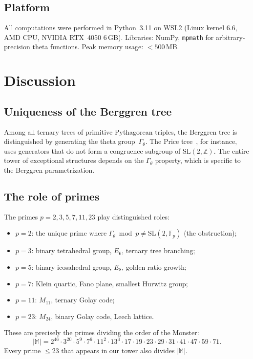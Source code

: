 \documentclass[12pt]{amsart}
\theoremstyle{definition}
\theoremstyle{remark}
\newcommand{\SL}{\mathrm{SL}}
\newcommand{\Fp}{\mathbb{F}_p}
\newcommand{\Z}{\mathbb{Z}}
\newcommand{\Gtheta}{\Gamma_\theta}
\newcommand{\Monster}{\mathbb{M}}
\begin{document}
\subsection{Platform}

All computations were performed in Python~3.11 on WSL2 (Linux kernel
6.6, AMD CPU, NVIDIA RTX~4050 6\,GB).  Libraries: NumPy,
\texttt{mpmath} for arbitrary-precision theta functions.  Peak memory
usage: $< 500$\,MB.

\section{Discussion}\label{sec:discussion}

\subsection{Uniqueness of the Berggren tree}

Among all ternary trees of primitive Pythagorean triples, the
Berggren tree is distinguished by generating the theta group~$\Gtheta$.
The Price tree~\cite{price}, for instance, uses generators that do not
form a congruence subgroup of $\SL(2,\Z)$.  The entire tower of
exceptional structures depends on the $\Gtheta$ property, which is
specific to the Berggren parametrization.

\subsection{The role of primes}

The primes $p = 2, 3, 5, 7, 11, 23$ play distinguished roles:
\begin{itemize}
\item $p = 2$: the unique prime where $\Gtheta \bmod p \ne \SL(2,\Fp)$
  (the obstruction);
\item $p = 3$: binary tetrahedral group, $E_6$, ternary tree branching;
\item $p = 5$: binary icosahedral group, $E_8$, golden ratio growth;
\item $p = 7$: Klein quartic, Fano plane, smallest Hurwitz group;
\item $p = 11$: $M_{11}$, ternary Golay code;
\item $p = 23$: $M_{24}$, binary Golay code, Leech lattice.
\end{itemize}
These are precisely the primes dividing the order of the Monster:
\[
|\Monster| = 2^{46}\cdot 3^{20}\cdot 5^9\cdot 7^6\cdot 11^2\cdot
13^3\cdot 17\cdot 19\cdot 23\cdot 29\cdot 31\cdot 41\cdot 47\cdot
59\cdot 71.
\]
Every prime $\le 23$ that appears in our tower also divides $|\Monster|$.
\end{document}
